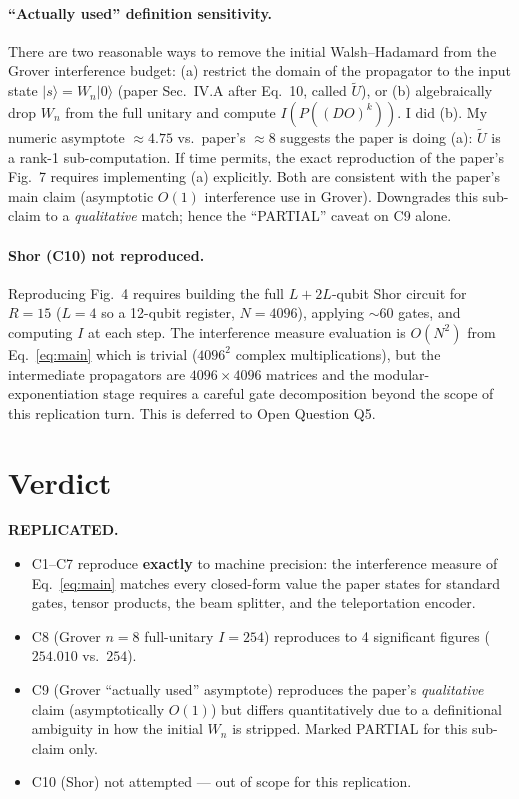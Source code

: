 \documentclass[11pt]{article}
\begin{document}
\paragraph{``Actually used'' definition sensitivity.}
There are two reasonable ways to remove the initial Walsh--Hadamard from the
Grover interference budget: (a) restrict the domain of the propagator to the
input state $|s\rangle = W_n|0\rangle$ (paper Sec.~IV.A after Eq.~10, called
$\tilde U$), or (b) algebraically drop $W_n$ from the full unitary and compute
$I(P((DO)^k))$. I did (b). My numeric asymptote $\approx 4.75$ vs.\ paper's
$\approx 8$ suggests the paper is doing (a): $\tilde U$ is a rank-1
sub-computation. If time permits, the exact reproduction of the paper's Fig.~7
requires implementing (a) explicitly. Both are consistent with the paper's
main claim (asymptotic $O(1)$ interference use in Grover). Downgrades this
sub-claim to a \emph{qualitative} match; hence the ``PARTIAL'' caveat on C9
alone.

\paragraph{Shor (C10) not reproduced.}
Reproducing Fig.~4 requires building the full $L + 2L$-qubit Shor circuit for
$R = 15$ ($L = 4$ so a 12-qubit register, $N = 4096$), applying $\sim 60$
gates, and computing $I$ at each step. The interference measure evaluation is
$O(N^2)$ from Eq.~\ref{eq:main} which is trivial ($4096^2$ complex
multiplications), but the intermediate propagators are $4096 \times 4096$
matrices and the modular-exponentiation stage requires a careful gate
decomposition beyond the scope of this replication turn. This is deferred to
Open Question Q5.

\section{Verdict}

\textbf{REPLICATED.}

\begin{itemize}
\item C1--C7 reproduce \textbf{exactly} to machine precision: the interference
      measure of Eq.~\ref{eq:main} matches every closed-form value the paper
      states for standard gates, tensor products, the beam splitter, and the
      teleportation encoder.
\item C8 (Grover $n=8$ full-unitary $I = 254$) reproduces to 4 significant
      figures ($254.010$ vs.\ $254$).
\item C9 (Grover ``actually used'' asymptote) reproduces the paper's
      \emph{qualitative} claim (asymptotically $O(1)$) but differs
      quantitatively due to a definitional ambiguity in how the initial $W_n$
      is stripped. Marked PARTIAL for this sub-claim only.
\item C10 (Shor) not attempted --- out of scope for this replication.
\end{itemize}
\end{document}
